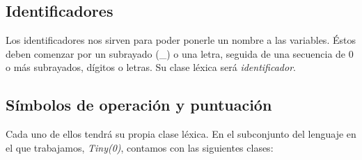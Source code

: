 \subsection{Identificadores}

Los identificadores nos sirven para poder ponerle un nombre a las variables. Éstos deben comenzar por un subrayado (\_) o una letra, seguida de una secuencia de 0 o más
subrayados, dígitos o letras. Su clase léxica será \textit{identificador}.

\subsection{Símbolos de operación y puntuación}

Cada uno de ellos tendrá su propia clase léxica. En el subconjunto del lenguaje en el que trabajamos, \textit{Tiny(0)}, contamos con
las siguientes clases:

